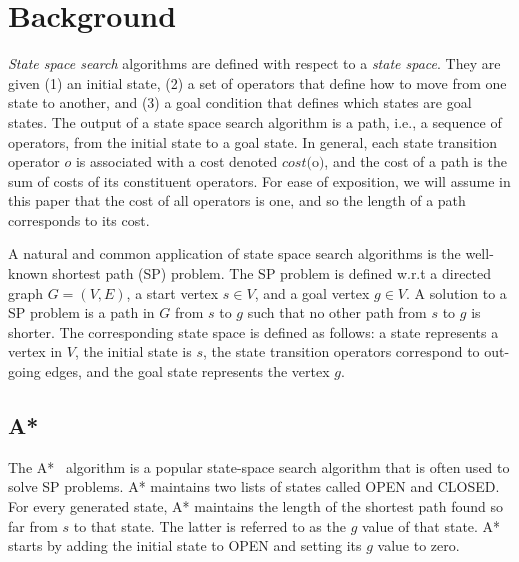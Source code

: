 \documentclass[letterpaper]{article} %
\newcommand\AF[1]{\nb{\textbf{Ariel:}}{red}{#1}}
\begin{document}
\section{Background}



\emph{State space search} algorithms are defined with respect to a \emph{state space}. 
They are given (1) an initial state, 
(2) a set of operators that define how to move from one state to another, and (3) a goal condition that defines which states are goal states. The output of a state space search algorithm is a path, i.e., a sequence of operators, from the initial state to a goal state. 
In general, each state transition operator $o$ is associated with a cost denoted $cost($o$)$, and the cost of a path is the sum of costs of its constituent operators. For ease of exposition, we will assume in this paper that the cost of all operators is one, and so the length of a path corresponds to its cost. %


A natural and common application of state space search algorithms is the well-known  shortest path (SP) problem. The SP problem is defined w.r.t a directed graph $G=(V,E)$, a start vertex $s\in V$, and a goal vertex $g\in V$. 
A solution to a SP problem is a path in $G$ from $s$ to $g$ such that no other path from $s$ to $g$ is shorter. The corresponding state space is defined as follows: a state represents a vertex in $V$, the initial state is $s$, the state transition operators correspond to out-going edges, and the goal state represents the vertex $g$. 






\subsection{A*}

The A*~\cite{hart1968formal} algorithm is a popular state-space search algorithm that is often used to solve SP problems.  
A* maintains two lists of states called OPEN and CLOSED. 
For every generated state, A* maintains the length of the shortest path found so far from $s$ to that state. The latter is referred to as the $g$ value of that state. A* starts by adding the initial state to OPEN and setting its $g$ value to zero. 
\end{document}
